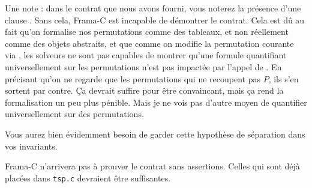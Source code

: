 \documentclass[11pt,answers]{exam}
\begin{document}
\begin{questions}
    Une note : dans le contrat que nous avons fourni, vous noterez la présence d’une clause \code{\\separated}. Sans cela, Frama-C est incapable de démontrer le contrat. Cela est dû au fait qu’on formalise nos permutations comme des tableaux, et non réellement comme des objets abstraits, et que comme on modifie la permutation courante via , les solveurs ne sont pas capables de montrer qu’une formule quantifiant universellement sur les permutations n’est pas impactée par l’appel de . En précisant qu’on ne regarde que les permutations qui ne recoupent pas $P$, ils s’en sortent par contre.
    Ça devrait suffire pour être convaincant, mais ça rend la formalisation un peu plus pénible. Mais je ne vois pas d’autre moyen de quantifier universellement sur des permutations.

    Vous aurez bien évidemment besoin de garder cette hypothèse de séparation dans vos invariants.

    Frama-C n’arrivera pas à prouver le contrat sans assertions. Celles qui sont déjà placées dans \texttt{tsp.c} devraient être suffisantes.

\end{questions}
\end{document}
